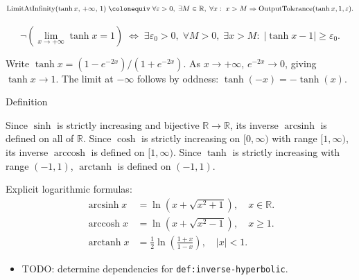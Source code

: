 \begin{remark*}
\[
  \operatorname{LimitAtInfinity}(\tanh x,\,+\infty,\,1)
  \;\colonequiv\;
  \forall\varepsilon>0,\;\exists M\in\mathbb{R},\;\forall x:\;
  x>M \Rightarrow \operatorname{OutputTolerance}(\tanh x,1,\varepsilon).
\]
\end{remark*}

\begin{remark*}
\[
  \neg\left(\lim_{x\to+\infty}\tanh x=1\right)
  \;\iff\;
  \exists\varepsilon_0>0,\;\forall M>0,\;\exists x>M:\;
  |\tanh x - 1|\geq\varepsilon_0.
\]
\end{remark*}

\begin{remark*}
Write $\tanh x = (1 - e^{-2x})/(1 + e^{-2x})$. As $x \to +\infty$,
$e^{-2x} \to 0$, giving $\tanh x \to 1$. The limit at $-\infty$
follows by oddness: $\tanh(-x) = -\tanh(x)$.
\end{remark*}


\begin{definitionbox}{Definition}
\begin{definition}
\label{def:inverse-hyperbolic}
Since $\sinh$ is strictly increasing and bijective $\mathbb{R} \to
\mathbb{R}$, its inverse $\operatorname{arcsinh}$ is defined on all
of $\mathbb{R}$. Since $\cosh$ is strictly increasing on
$[0,\infty)$ with range $[1,\infty)$, its inverse
$\operatorname{arccosh}$ is defined on $[1,\infty)$. Since $\tanh$
is strictly increasing with range $(-1,1)$, $\operatorname{arctanh}$
is defined on $(-1,1)$.

Explicit logarithmic formulas:
\begin{align*}
  \operatorname{arcsinh} x
  &= \ln\!\left(x + \sqrt{x^2+1}\right),
  \quad x \in \mathbb{R}. \\
  \operatorname{arccosh} x
  &= \ln\!\left(x + \sqrt{x^2-1}\right),
  \quad x \geq 1. \\
  \operatorname{arctanh} x
  &= \tfrac{1}{2}\ln\!\left(\frac{1+x}{1-x}\right),
  \quad |x| < 1.
\end{align*}
\end{definition}
\end{definitionbox}

\begin{dependencies}
\begin{itemize}
  \item TODO: determine dependencies for \texttt{def:inverse-hyperbolic}.
\end{itemize}
\end{dependencies}


